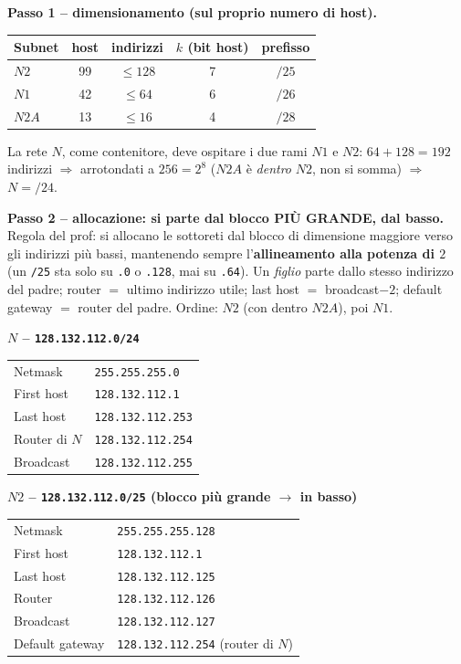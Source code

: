 \documentclass{report}
\begin{document}
\begin{solution}
\textbf{Passo 1 -- dimensionamento (sul proprio numero di host).}
\begin{center}
\begin{tabular}{lcccc}
\hline
Subnet & host & indirizzi & $k$ (bit host) & prefisso \\
\hline
$N2$  & 99 & $\le 128$ & 7 & $/25$ \\
$N1$  & 42 & $\le 64$  & 6 & $/26$ \\
$N2A$ & 13 & $\le 16$  & 4 & $/28$ \\
\hline
\end{tabular}
\end{center}
La rete $N$, come contenitore, deve ospitare i due rami $N1$ e $N2$: $64+128=192$
indirizzi $\Rightarrow$ arrotondati a $256=2^8$ ($N2A$ è \emph{dentro} $N2$, non si
somma) $\Rightarrow$ $N=/24$.

\textbf{Passo 2 -- allocazione: si parte dal blocco PIÙ GRANDE, dal basso.}
Regola del prof: si allocano le sottoreti dal blocco di dimensione maggiore verso
gli indirizzi più bassi, mantenendo sempre l'\textbf{allineamento alla potenza di
$2$} (un \texttt{/25} sta solo su \texttt{.0} o \texttt{.128}, mai su \texttt{.64}).
Un \emph{figlio} parte dallo stesso indirizzo del padre; router $=$ ultimo
indirizzo utile; last host $=$ broadcast$-2$; default gateway $=$ router del padre.
Ordine: $N2$ (con dentro $N2A$), poi $N1$.

\medskip
\noindent\textbf{$N$ -- \texttt{128.132.112.0/24}}
\begin{center}
\begin{tabular}{ll}
\hline
Netmask & \texttt{255.255.255.0} \\
First host & \texttt{128.132.112.1} \\
Last host & \texttt{128.132.112.253} \\
Router di $N$ & \texttt{128.132.112.254} \\
Broadcast & \texttt{128.132.112.255} \\
\hline
\end{tabular}
\end{center}

\noindent\textbf{$N2$ -- \texttt{128.132.112.0/25} \;(blocco più grande $\to$ in basso)}
\begin{center}
\begin{tabular}{ll}
\hline
Netmask & \texttt{255.255.255.128} \\
First host & \texttt{128.132.112.1} \\
Last host & \texttt{128.132.112.125} \\
Router & \texttt{128.132.112.126} \\
Broadcast & \texttt{128.132.112.127} \\
Default gateway & \texttt{128.132.112.254} (router di $N$) \\
\hline
\end{tabular}
\end{center}


\end{solution}
\end{document}
